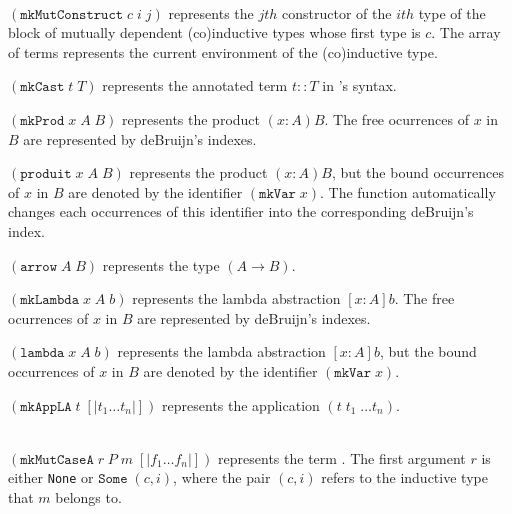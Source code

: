 \begin{description}
 {\\ $(\texttt{mkMutConstruct}\;c\;i\;j)$ represents the
    $jth$ constructor of the $ith$ type of the block of mutually
    dependent (co)inductive types whose first type is $c$. The array
    of terms represents the current environment of the (co)inductive
    type.}

    {$(\texttt{mkCast}\;t\;T)$ represents the annotated term $t::T$ in
    \Coq's syntax.}  

    {$(\texttt{mkProd}\;x\;A\;B)$ represents the product $(x:A)B$.
     The free ocurrences of $x$ in $B$ are represented by deBruijn's
     indexes.}

    {$(\texttt{produit}\;x\;A\;B)$ represents the product $(x:A)B$,
     but the bound occurrences of $x$ in $B$ are denoted by 
     the identifier $(\texttt{mkVar}\;x)$. The function automatically 
     changes each occurrences of this identifier into the corresponding 
     deBruijn's index.}

    {$(\texttt{arrow}\;A\;B)$ represents the type $(A\rightarrow B)$.}

    {$(\texttt{mkLambda}\;x\;A\;b)$ represents the lambda abstraction 
     $[x:A]b$. The free ocurrences of $x$ in $B$ are represented by deBruijn's
     indexes.}

    {$(\texttt{lambda}\;x\;A\;b)$ represents the lambda abstraction 
     $[x:A]b$, but the bound occurrences of $x$ in $B$ are denoted by 
     the identifier $(\texttt{mkVar}\;x)$. }

    {$(\texttt{mkAppLA}\;t\;[|t_1\ldots t_n|])$ represents the application
    $(t\;t_1\;\ldots t_n)$.}

    {\\ $(\texttt{mkMutCaseA}\;r\;P\;m\;[|f_1\ldots f_n|])$
    represents the term . The first argument
    $r$ is either \texttt{None} or $\texttt{Some}\;(c,i)$, where the
    pair $(c,i)$ refers to the inductive type that $m$ belongs to.}


\end{description}
